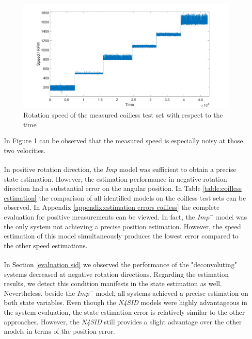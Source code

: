 \documentclass[english]{isasthesis}
\begin{document}
\begin{figure}[p]
    		\centering
      		\includegraphics[width=1\textwidth]{figures/noisy_speed.jpg}   
    		\caption{Rotation speed of the measured coilless test set with respect to the time}
    		\label{fig:noisy meas}
    		\end{figure}In Figure \ref{fig:noisy meas} can be observed that the measured speed is especially noisy at those two velocities. \\ \\
    		In positive rotation direction, the \textit{Imp} model was sufficient to obtain a precise state estimation. However, the estimation performance in negative rotation direction had a substantial error on the angular position. In Table \ref{table:coilless estimation} the comparison of all identified models on the coilless test sets can be observed. In Appendix \ref{appendix:estimation errors coilless} the complete evaluation for positive measurements can be viewed. In fact, the $\textit{Imp}^-$ model was the only system not achieving a precise position estimation. However, the speed estimation of this model simultaneously produces the lowest error compared to the other speed estimations. \\\\
			In Section \ref{evaluation sid} we observed the performance of the "deconvoluting" systems decreased at negative rotation directions. Regarding the estimation results, we detect this condition manifests in the state estimation as well. Nevertheless, beside the $\textit{Imp}^-$ model, all systems achieved a precise estimation on both state variables. Even though the \textit{N4SID} models were highly advantageous in the system evaluation, the state estimation error is relatively similar to the other approaches. However, the \textit{N4SID} still provides a slight advantage over the other models in terms of the position error. 
\end{document}
